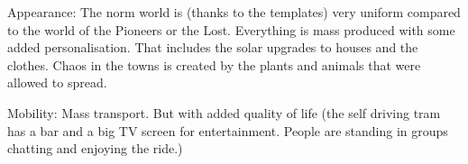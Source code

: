 Appearance: The norm world is (thanks to the templates) very uniform compared to the world of the Pioneers or the Lost. Everything is mass produced with some added personalisation. That includes the solar upgrades to houses and the clothes.
Chaos in the towns is created by the plants and animals that were allowed to spread.

Mobility: Mass transport. But with added quality of life (the self driving tram has a bar and a big TV screen for entertainment. People are standing in groups chatting and enjoying the ride.)
